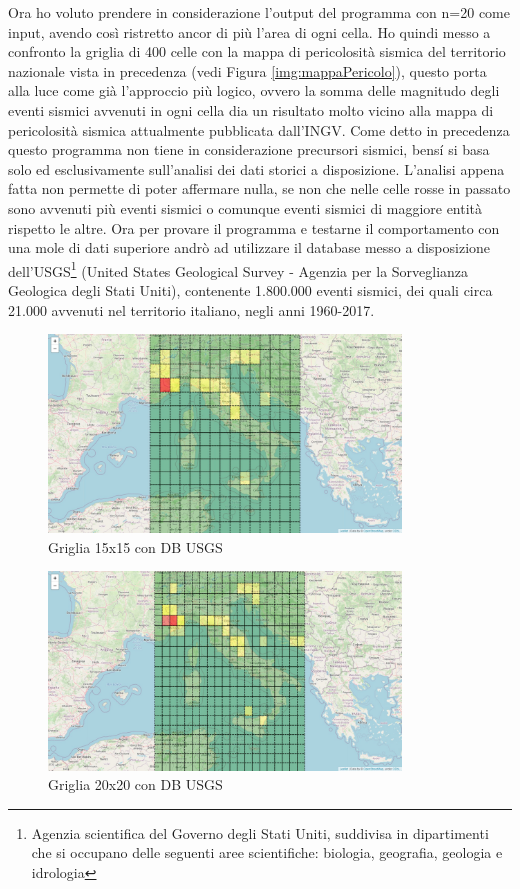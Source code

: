 Ora ho voluto prendere in considerazione l'output del programma con n=20 come input, avendo cos\`i ristretto ancor di pi\`u l'area di ogni cella. Ho quindi messo a confronto la griglia di 400 celle con la mappa di pericolosit\`a sismica del territorio nazionale vista in precedenza (vedi Figura \ref{img:mappaPericolo}), questo porta alla luce come gi\`a l'approccio pi\`u logico, ovvero la somma delle magnitudo degli eventi sismici avvenuti in ogni cella dia un risultato molto vicino alla mappa di pericolosit\`a sismica attualmente pubblicata dall'INGV. Come detto in precedenza questo programma non tiene in considerazione precursori sismici, bens\'i si basa solo ed esclusivamente sull'analisi dei dati storici a disposizione. L'analisi appena fatta non permette di poter affermare nulla, se non che nelle celle rosse in passato sono avvenuti pi\`u eventi sismici o comunque eventi sismici di maggiore entit\`a rispetto le altre. Ora per provare il programma e testarne il comportamento con una mole di dati superiore andr\`o ad utilizzare il database messo a disposizione dell'USGS\footnote{Agenzia scientifica del Governo degli Stati Uniti, suddivisa in dipartimenti che si occupano delle seguenti aree scientifiche: biologia, geografia, geologia e idrologia} (United States Geological Survey - Agenzia per la Sorveglianza Geologica degli Stati Uniti), contenente 1.800.000 eventi sismici, dei quali circa 21.000 avvenuti nel territorio italiano, negli anni 1960-2017.

\begin{figure}[H]
   \centering
   \includegraphics[width=0.835\textwidth]{images/15x15_USGS.jpg}
   \caption{Griglia 15x15 con DB USGS}
   \label{fig:15x15USGS}
\end{figure}

\begin{figure}[H]
   \centering
   \includegraphics[width=0.835\textwidth]{images/20x20_USGS.jpg}
   \caption{Griglia 20x20 con DB USGS}
   \label{fig:20x20USGS}
\end{figure}

